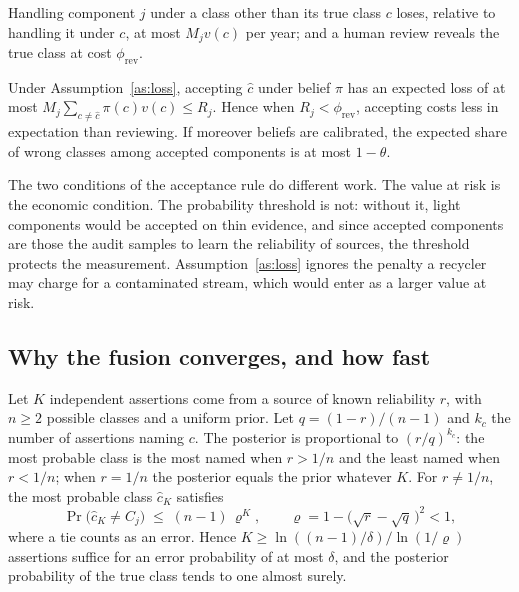 \begin{assumption}\label{as:loss}
Handling component $j$ under a class other than its true class $c$ loses, relative to handling it under $c$, at most
$M_jv(c)$ per year; and a human review reveals the true class at cost $\phi_{\mathrm{rev}}$.
\end{assumption}

\begin{lemma}[Acceptance]\label{lem:accept}
Under Assumption~\ref{as:loss}, accepting $\hat c$ under belief $\pi$ has an expected loss of at most
$M_j\sum_{c\ne\hat c}\pi(c)v(c)\le R_j$. Hence when $R_j<\phi_{\mathrm{rev}}$, accepting costs less in expectation
than reviewing. If moreover beliefs are calibrated, the expected share of wrong classes among accepted components
is at most $1-\theta$.
\end{lemma}

The two conditions of the acceptance rule do different work. The value at risk is the economic condition. The
probability threshold is not: without it, light components would be accepted on thin evidence, and since accepted
components are those the audit samples to learn the reliability of sources, the threshold protects the measurement.
Assumption~\ref{as:loss} ignores the penalty a recycler may charge for a contaminated stream, which would enter as a
larger value at risk.

\subsection{Why the fusion converges, and how fast}

\begin{proposition}\label{prop:fusion}
Let $K$ independent assertions come from a source of known reliability $r$, with $n\ge2$ possible classes and a
uniform prior. Let $q=(1-r)/(n-1)$ and $k_c$ the number of assertions naming $c$. The posterior is proportional to
$(r/q)^{k_c}$: the most probable class is the most named when $r>1/n$ and the least named when $r<1/n$; when
$r=1/n$ the posterior equals the prior whatever $K$. For $r\ne1/n$, the most probable class $\hat c_K$ satisfies
\begin{equation}\label{eq:rate}
\Pr\big(\hat c_K\ne C_j\big)\;\le\;(n-1)\,\varrho^{K},\qquad\varrho=1-\big(\sqrt r-\sqrt q\,\big)^2<1,
\end{equation}
where a tie counts as an error. Hence $K\ge\ln((n-1)/\delta)/\ln(1/\varrho)$ assertions suffice for an error
probability of at most $\delta$, and the posterior probability of the true class tends to one almost surely.
\end{proposition}


